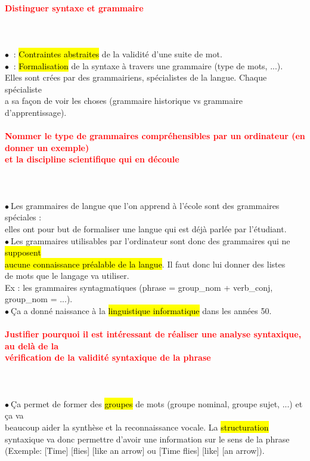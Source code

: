 \documentclass[letterpaper, 12pt]{article}
\newcommand{\alinea}{
\hspace*{0.3cm}}
\newcommand{\red}[1]{
	\textcolor{red}{#1}
}
\newcommand{\myul}[1]{
	\underline{\smash{#1}}
}
\newcommand{\point}{$\bullet\ $}
\begin{document}
		\paragraph{\red{Distinguer syntaxe et grammaire}}~\\~\\
			\point \myul{Syntaxe} : \hl{Contraintes abstraites} de la validité d'une suite de mot.\\
			\point \myul{Grammaire} : \hl{Formalisation} de la syntaxe à travers une grammaire (type de mots, ...).
				\\\alinea Elles sont crées par des grammairiens, spécialistes de la langue. Chaque spécialiste
				\\\alinea a sa façon de voir les choses (grammaire historique vs grammaire d'apprentissage).
		
		\paragraph{\red{Nommer le type de grammaires compréhensibles par un ordinateur (en donner un exemple)  
		~\\ \hspace*{0.035cm} et la discipline scientifique qui en découle}}~\\~\\
			\point Les grammaires de langue que l'on apprend à l'école sont des grammaires spéciales : 
				\\\alinea elles ont pour but de formaliser une langue qui est déj\`a parlée par l'étudiant.\\
			\point Les grammaires utilisables par l'ordinateur sont donc des grammaires qui ne \hl{supposent}
				\\\alinea \hl{aucune connaissance pr\'ealable de la langue}. Il faut donc lui donner des listes 
				\\\alinea de mots que le langage va utiliser. 
				\\\alinea Ex : les grammaires syntagmatiques (phrase = group\_nom + verb\_conj, 
					group\_nom = ...).\\
			\point \c Ca a donné naissance à la \hl{linguistique informatique} dans les années 50.
		
		\paragraph{\red{Justifier pourquoi il est intéressant de réaliser une analyse syntaxique, au delà de la 
		~\\ \hspace*{0.035cm} vérification de la validité syntaxique de la phrase}}~\\~\\
			\point \c Ca permet de former des \hl{groupes} de mots (groupe nominal, groupe sujet, ...) et ça va 
				\\\alinea beaucoup aider la synthèse et la reconnaissance vocale. La \hl{structuration} 
				\\\alinea syntaxique va donc permettre d'avoir une information sur le sens de la phrase
				\\\alinea (Exemple: [Time] [flies] [like an arrow] ou [Time flies] [like] [an arrow]).
	
\end{document}
